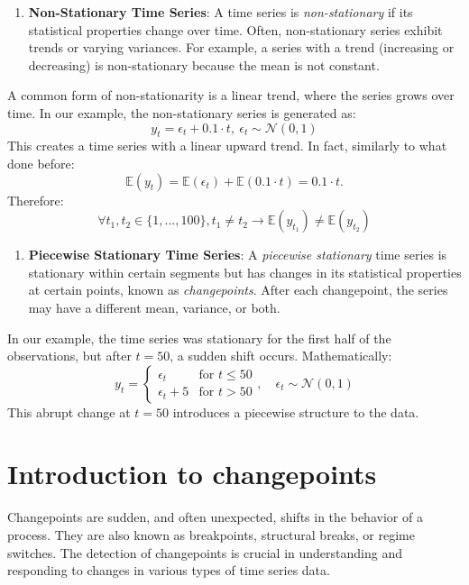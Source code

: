 \documentclass[
  letterpaper,
  DIV=11,
  numbers=noendperiod]{scrreprt}
\providecommand{\tightlist}{%
  \setlength{\itemsep}{0pt}\setlength{\parskip}{0pt}}\usepackage{longtable,booktabs,array}
\begin{document}
\begin{enumerate}
\def\labelenumi{\arabic{enumi}.}
\setcounter{enumi}{1}
\tightlist
\item
  \textbf{Non-Stationary Time Series}: A time series is
  \emph{non-stationary} if its statistical properties change over time.
  Often, non-stationary series exhibit trends or varying variances. For
  example, a series with a trend (increasing or decreasing) is
  non-stationary because the mean is not constant.
\end{enumerate}

A common form of non-stationarity is a linear trend, where the series
grows over time. In our example, the non-stationary series is generated
as: \[
    y_t = \epsilon_t + 0.1 \cdot t , \ \epsilon_t \sim \mathcal{N}(0, 1)
\] This creates a time series with a linear upward trend. In fact,
similarly to what done before: \[
    \mathbb{E}(y_t) = \mathbb{E}(\epsilon_t) + \mathbb{E}(0.1 \cdot t) = 0.1 \cdot t. 
\] Therefore: \[
  \forall t_1, t_2 \in \{1, ..., 100\}, t_1 \neq t_2 \rightarrow \mathbb{E}(y_{t_1}) \neq \mathbb{E}(y_{t_2})
\]

\begin{enumerate}
\def\labelenumi{\arabic{enumi}.}
\setcounter{enumi}{2}
\tightlist
\item
  \textbf{Piecewise Stationary Time Series}: A \emph{piecewise
  stationary} time series is stationary within certain segments but has
  changes in its statistical properties at certain points, known as
  \emph{changepoints}. After each changepoint, the series may have a
  different mean, variance, or both.
\end{enumerate}

In our example, the time series was stationary for the first half of the
observations, but after \(t = 50\), a sudden shift occurs.
Mathematically: \[
y_t = \begin{cases} 
    \epsilon_t & \text{for } t \leq 50 \\
    \epsilon_t + 5 & \text{for } t > 50
    \end{cases}, \quad \epsilon_t \sim \mathcal{N}(0, 1)
\] This abrupt change at \(t = 50\) introduces a piecewise structure to
the data.

\section{Introduction to
changepoints}\label{introduction-to-changepoints}

Changepoints are sudden, and often unexpected, shifts in the behavior of
a process. They are also known as breakpoints, structural breaks, or
regime switches. The detection of changepoints is crucial in
understanding and responding to changes in various types of time series
data.
\end{document}
